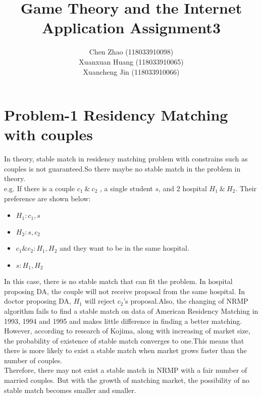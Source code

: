 \documentclass[12pt]{article}
\begin{document}
 
 
 
\title{Game Theory and the Internet Application Assignment3}%
\author{Chen Zhao (118033910098)\\
Xuanxuan Huang (118033910065)\\
Xuancheng Jin (118033910066)}
 
\maketitle

\section{Problem-1 Residency Matching with couples}
In theory, stable match in residency matching problem with constrains such as couples is not guaranteed.So there maybe no stable match in the problem in theory.\\
e.g. If there is a couple $c_1\ \&\ c_2$ , a single student $s$, and 2 hospital $H_1\ \&\  H_2$. Their preference are shown below:
\begin{itemize}
    \item $H_1: c_1, s$
    \item $H_2: s, c_2$
    \item $c_1 \& c_2:H_1, H_2$ and they want to be in the same hospital.
    \item $s:H_1, H_2$
\end{itemize}
In this case, there is no stable match that can fit the problem. In hospital proposing DA, the couple will not receive proposal from the same hospital. In doctor proposing DA, $H_1$ will reject $c_2$'s proposal.Also, the changing of NRMP algorithm fails to find a stable match on data of American Residency Matching in 1993, 1994 and 1995 and makes little difference in finding a better matching.\cite{roth1997effects}
\\
However, according to research of Kojima, along with increasing of market size, the probability of existence of stable match converges to one.\cite{kojima2009incentives}This means that there is more likely to exist a stable match when market grows faster than the number of couples.
\\
Therefore, there may not exist a stable match in NRMP with a fair number of married couples. But with the growth of matching market, the possibility of no stable match becomes smaller and smaller.
\end{document}
